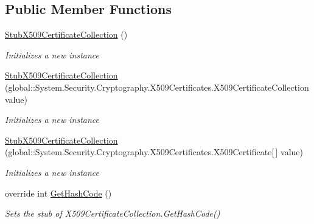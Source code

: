 \subsection*{Public Member Functions}
\begin{DoxyCompactItemize}
\item 
\hyperlink{class_system_1_1_security_1_1_cryptography_1_1_x509_certificates_1_1_fakes_1_1_stub_x509_certificate_collection_ad1de57887d7a5c2875808473160b4ed1}{Stub\-X509\-Certificate\-Collection} ()
\begin{DoxyCompactList}\small\item\em Initializes a new instance\end{DoxyCompactList}\item 
\hyperlink{class_system_1_1_security_1_1_cryptography_1_1_x509_certificates_1_1_fakes_1_1_stub_x509_certificate_collection_af2ce9c562a97ea5432494d2ee98e120d}{Stub\-X509\-Certificate\-Collection} (global\-::\-System.\-Security.\-Cryptography.\-X509\-Certificates.\-X509\-Certificate\-Collection value)
\begin{DoxyCompactList}\small\item\em Initializes a new instance\end{DoxyCompactList}\item 
\hyperlink{class_system_1_1_security_1_1_cryptography_1_1_x509_certificates_1_1_fakes_1_1_stub_x509_certificate_collection_a32b8df7cdb424c8d55a8de992cba3d43}{Stub\-X509\-Certificate\-Collection} (global\-::\-System.\-Security.\-Cryptography.\-X509\-Certificates.\-X509\-Certificate\mbox{[}$\,$\mbox{]} value)
\begin{DoxyCompactList}\small\item\em Initializes a new instance\end{DoxyCompactList}\item 
override int \hyperlink{class_system_1_1_security_1_1_cryptography_1_1_x509_certificates_1_1_fakes_1_1_stub_x509_certificate_collection_a8e0d0dea9d86ef458a07f63c464caa53}{Get\-Hash\-Code} ()
\begin{DoxyCompactList}\small\item\em Sets the stub of X509\-Certificate\-Collection.\-Get\-Hash\-Code()\end{DoxyCompactList}\end{DoxyCompactItemize}
